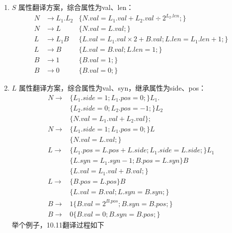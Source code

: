 \documentclass[a4paper, justified]{tufte-handout}
\begin{document}
\begin{solution}
  \begin{enumerate}[(1)]
    \item  $S$ 属性翻译方案，综合属性为val、len：\\
      \begin{align*}
        N &\to L_1 . L_2 & \{N.val = L_1.val + L_2.val \div 2^{L_2.len};\}\\
        N &\to L &\{N.val = L.val;\}\\
        L &\to L_1B &\{L.val = L_1.val \times  2 + B.val;L.len = L_1.len+1;\}\\
        L &\to B &\{L.val = B.val;L.len = 1;\}\\
        B &\to 1 &\{B.val = 1;\}\\
        B &\to 0 &\{B.val = 0;\}
      \end{align*}
    \item $L$ 属性翻译方案，综合属性为val、syn，继承属性为side、pos：\\
      \begin{align*}
        N \to &\{L_1.side = 1;L_1.pos=0;\}L_1 .\\
              &\{L_2.side = 0;L_2.pos=-1;\} L_2 \\
              &\{N.val = L_1.val + L_2.val\};\\
        N \to &\{L_1.side = 1;L_1.pos=0;\}L \\
              &\{N.val = L.val;\}\\
        L \to &\{L_1.pos=L.pos+L.side;L_1.side=L.side;\}L_1\\
              &\{L.syn=L_1.syn-1;B.pos=L.syn\}B \\
              &\{L.val = L_1.val + B.val;\}\\
        L \to &\{B.pos=L.pos\}B \\
              &\{L.val = B.val;L.syn = B.syn;\}\\
        B \to &1 \{B.val = 2^{B.pos};B.syn=B.pos;\}\\
        B \to &0 \{B.val = 0;B.syn=B.pos;\}
      \end{align*}
      举个例子，10.11翻译过程如下
  \end{enumerate}
\end{solution}




\end{document}
